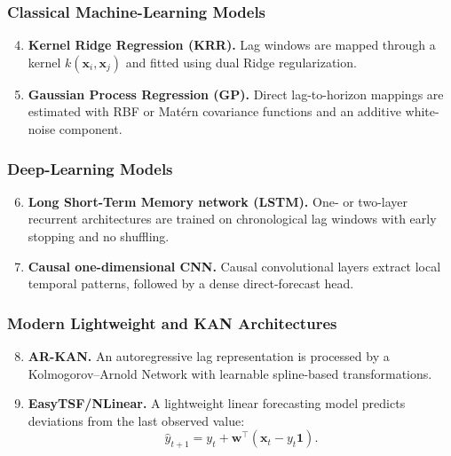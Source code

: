 \documentclass[review,number,sort&compress]{elsarticle}
\begin{document}
\subsubsection{Classical Machine-Learning Models}

\begin{enumerate}
    \setcounter{enumi}{3}

    \item \textbf{Kernel Ridge Regression (KRR).}
    Lag windows are mapped through a kernel
    $k(\bm{x}_i,\bm{x}_j)$ and fitted using dual Ridge regularization.

    \item \textbf{Gaussian Process Regression (GP).}
    Direct lag-to-horizon mappings are estimated with RBF or Matérn covariance
    functions and an additive white-noise component.
\end{enumerate}

\subsubsection{Deep-Learning Models}

\begin{enumerate}
    \setcounter{enumi}{5}

    \item \textbf{Long Short-Term Memory network (LSTM).}
    One- or two-layer recurrent architectures are trained on chronological lag
    windows with early stopping and no shuffling.

    \item \textbf{Causal one-dimensional CNN.}
    Causal convolutional layers extract local temporal patterns, followed by a
    dense direct-forecast head.
\end{enumerate}

\subsubsection{Modern Lightweight and KAN Architectures}

\begin{enumerate}
    \setcounter{enumi}{7}

    \item \textbf{AR-KAN.}
    An autoregressive lag representation is processed by a
    Kolmogorov--Arnold Network with learnable spline-based transformations.

    \item \textbf{EasyTSF/NLinear.}
    A lightweight linear forecasting model predicts deviations from the last
    observed value:
    \begin{equation}
        \widehat{y}_{t+1}
        =
        y_t
        +
        \bm{w}^\top
        \left(
        \bm{x}_t-y_t\bm{1}
        \right).
    \end{equation}
\end{enumerate}
\end{document}
